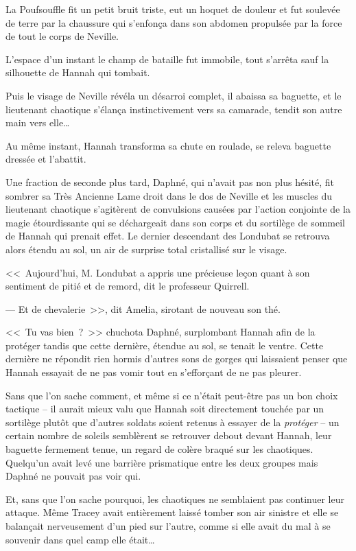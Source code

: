 La Poufsouffle fit un petit bruit triste, eut un hoquet de douleur et fut soulevée de terre par la chaussure qui s'enfonça dans son abdomen propulsée par la force de tout le corps de Neville.

L'espace d'un instant le champ de bataille fut immobile, tout s'arrêta sauf la silhouette de Hannah qui tombait.

Puis le visage de Neville révéla un désarroi complet, il abaissa sa baguette, et le lieutenant chaotique s'élança instinctivement vers sa camarade, tendit son autre main vers elle…

Au même instant, Hannah transforma sa chute en roulade, se releva baguette dressée et l'abattit.

Une fraction de seconde plus tard, Daphné, qui n'avait pas non plus hésité, fit sombrer sa Très Ancienne Lame droit dans le dos de Neville et les muscles du lieutenant chaotique s'agitèrent de convulsions causées par l'action conjointe de la magie étourdissante qui se déchargeait dans son corps et du sortilège de sommeil de Hannah qui prenait effet. Le dernier descendant des Londubat se retrouva alors étendu au sol, un air de surprise total cristallisé sur le visage.

\later

<<~Aujourd'hui, M. Londubat a appris une précieuse leçon quant à son sentiment de pitié et de remord, dit le professeur Quirrell.

--- Et de chevalerie~>>, dit Amelia, sirotant de nouveau son thé.

\later

<<~Tu vas bien~?~>> chuchota Daphné, surplombant Hannah afin de la protéger tandis que cette dernière, étendue au sol, se tenait le ventre. Cette dernière ne répondit rien hormis d'autres sons de gorges qui laissaient penser que Hannah essayait de ne pas vomir tout en s'efforçant de ne pas pleurer.

Sans que l'on sache comment, et même si ce n'était peut-être pas un bon choix tactique -- il aurait mieux valu que Hannah soit directement touchée par un sortilège plutôt que d'autres soldats soient retenus à essayer de la \emph{protéger} -- un certain nombre de soleils semblèrent se retrouver debout devant Hannah, leur baguette fermement tenue, un regard de colère braqué sur les chaotiques. Quelqu'un avait levé une barrière prismatique entre les deux groupes mais Daphné ne pouvait pas voir qui.

Et, sans que l'on sache pourquoi, les chaotiques ne semblaient pas continuer leur attaque. Même Tracey avait entièrement laissé tomber son air sinistre et elle se balançait nerveusement d'un pied sur l'autre, comme si elle avait du mal à se souvenir dans quel camp elle était…

